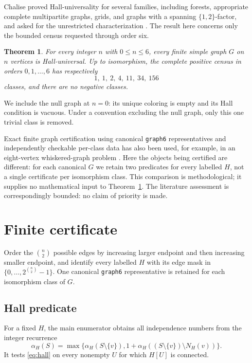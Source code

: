 \documentclass[11pt]{article}
\newtheorem{theorem}{Theorem}
\begin{document}
Chalise proved Hall-universality for several families, including forests,
appropriate complete multipartite graphs, grids, and graphs with a spanning
$\{1,2\}$-factor, and asked for the unrestricted characterization
\cite{Chalise2026}.  The result here concerns only the bounded census requested
through order six.

\begin{theorem}\label{thm:main}
For every integer $n$ with $0\leq n\leq6$, every finite simple graph $G$ on
$n$ vertices is Hall-universal.  Up to isomorphism, the complete positive
census in orders $0,1,\ldots,6$ has respectively
\[
  1,\ 1,\ 2,\ 4,\ 11,\ 34,\ 156
\]
classes, and there are no negative classes.
\end{theorem}

We include the null graph at $n=0$: its unique coloring is empty and its Hall
condition is vacuous.  Under a convention excluding the null graph, only this
one trivial class is removed.

Exact finite graph certification using canonical \texttt{graph6}
representatives and independently checkable per-class data has also been used,
for example, in an eight-vertex whiskered-graph problem
\cite{Zeng2026SSRN7385138}.  Here the objects being certified are different:
for each canonical $G$ we retain two predicates for every labelled $H$, not a
single certificate per isomorphism class.  This comparison is methodological;
it supplies no mathematical input to Theorem~\ref{thm:main}.  The literature
assessment is correspondingly bounded: no claim of priority is made.

\section{Finite certificate}

Order the $\binom n2$ possible edges by increasing larger endpoint and then
increasing smaller endpoint, and identify every labelled $H$ with its edge
mask in $\{0,\ldots,2^{\binom n2}-1\}$.  One canonical \texttt{graph6}
representative is retained for each isomorphism class of $G$.

\subsection{Hall predicate}

For a fixed $H$, the main enumerator obtains all independence numbers from the
integer recurrence
\begin{equation}\label{eq:alpha}
 \alpha_H(S)=\max\bigl\{\alpha_H(S\setminus\{v\}),
 1+\alpha_H((S\setminus\{v\})\setminus N_H(v))\bigr\}.
\end{equation}
It tests \eqref{eq:hall} on every nonempty $U$ for which $H[U]$ is connected.
\end{document}
